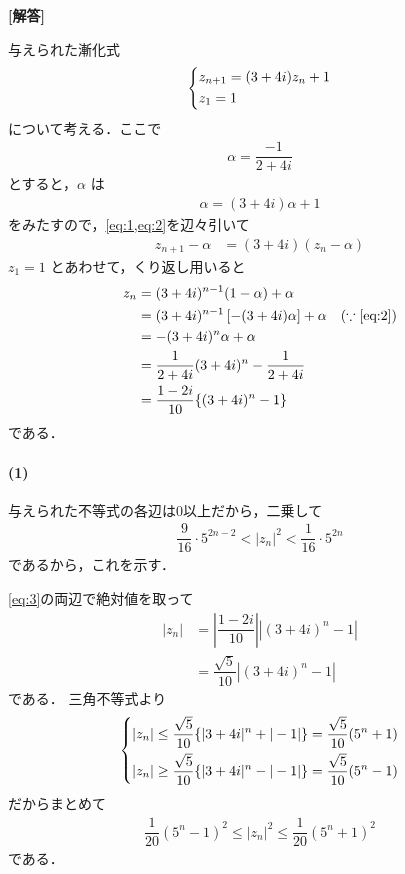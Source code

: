 \documentclass[../../main.tex]{subfiles}
\begin{document}
\begin{oframed}
  
\end{oframed}

{\bf [解答]}

与えられた漸化式
\begin{align}
  \begin{dcases}
    z_{n+1}=(3+4i)z_n+1 \\
    z_1=1
  \end{dcases} \label{eq:1}
\end{align}
について考える．ここで
\begin{align}
  \alpha = \dfrac{-1}{2+4i}
\end{align}
とすると，$\alpha$ は
\begin{align}
  \alpha = (3+4i)\alpha + 1 \label{eq:2}
\end{align}
をみたすので，\cref{eq:1,eq:2}を辺々引いて
\begin{align}
  z_{n+1} - \alpha &= (3+4i)(z_n - \alpha)
\end{align}
$z_1 = 1$ とあわせて，くり返し用いると
\begin{align}
  z_n
  &= (3+4i)^{n-1}(1 - \alpha) + \alpha \\
  &= (3+4i)^{n-1}\left[-(3+4i)\alpha\right] + \alpha \quad (\because\text{\cref{eq:2}})\\
  &= -(3+4i)^{n}\alpha + \alpha \\
  &= \dfrac{1}{2+4i}(3+4i)^{n} - \dfrac{1}{2+4i} \\
  &= \dfrac{1-2i}{10}\{(3+4i)^{n} - 1\} \label{eq:3}
\end{align}
である．

\paragraph{(1)}

与えられた不等式の各辺は$0$以上だから，二乗して
\begin{align}
  \dfrac{9}{16} \cdot 5^{2n-2} < |z_n|^2 < \dfrac{1}{16} \cdot 5^{2n} \label{eq:4}
\end{align}
であるから，これを示す．

\cref{eq:3}の両辺で絶対値を取って
\begin{align}
  |z_n|
  &= \left|\dfrac{1-2i}{10}\right| |(3+4i)^{n} - 1| \\
  &= \dfrac{\sqrt{5}}{10} |(3+4i)^{n} - 1|
\end{align}
である．
三角不等式より
\begin{align}
  \begin{dcases}
    |z_n| \le \dfrac{\sqrt{5}}{10} \{ |3+4i|^{n} + |-1| \} = \dfrac{\sqrt{5}}{10} (5^{n} + 1) \\
    |z_n| \ge \dfrac{\sqrt{5}}{10} \{ |3+4i|^{n} - |-1| \} = \dfrac{\sqrt{5}}{10} (5^{n} - 1)
  \end{dcases}
\end{align}
だからまとめて
\begin{align}
  \dfrac{1}{20}(5^n-1)^2 \le |z_n|^2 \le \dfrac{1}{20}(5^n+1)^2 \label{eq:5}
\end{align}
である．
\end{document}
